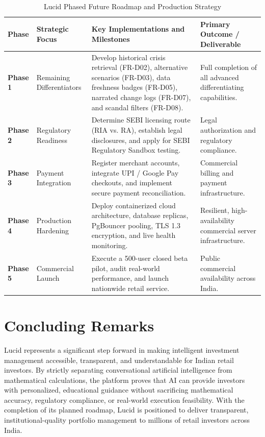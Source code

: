 \begin{table}[H]
\centering
\small
\setlength{\tabcolsep}{4pt}
\caption{Lucid Phased Future Roadmap and Production Strategy}
\label{tab:consolidated_roadmap}
\begin{tabularx}{\textwidth}{l >{\RaggedRight\arraybackslash}p{2.2cm} >{\RaggedRight\arraybackslash}X >{\RaggedRight\arraybackslash}p{3.0cm}}
\toprule
\textbf{Phase} & \textbf{Strategic Focus} & \textbf{Key Implementations and Milestones} & \textbf{Primary Outcome / Deliverable} \\
\midrule
\textbf{Phase 1} & Remaining Differentiators & Develop historical crisis retrieval (FR-D02), alternative scenarios (FR-D03), data freshness badges (FR-D05), narrated change logs (FR-D07), and scandal filters (FR-D08). & Full completion of all advanced differentiating capabilities. \\
\addlinespace[4pt]
\textbf{Phase 2} & Regulatory Readiness & Determine SEBI licensing route (RIA vs. RA), establish legal disclosures, and apply for SEBI Regulatory Sandbox testing. & Legal authorization and regulatory compliance. \\
\addlinespace[4pt]
\textbf{Phase 3} & Payment Integration & Register merchant accounts, integrate UPI / Google Pay checkouts, and implement secure payment reconciliation. & Commercial billing and payment infrastructure. \\
\addlinespace[4pt]
\textbf{Phase 4} & Production Hardening & Deploy containerized cloud architecture, database replicas, PgBouncer pooling, TLS 1.3 encryption, and live health monitoring. & Resilient, high-availability commercial server infrastructure. \\
\addlinespace[4pt]
\textbf{Phase 5} & Commercial Launch & Execute a 500-user closed beta pilot, audit real-world performance, and launch nationwide retail service. & Public commercial availability across India. \\
\bottomrule
\end{tabularx}
\end{table}

\section{Concluding Remarks}
Lucid represents a significant step forward in making intelligent investment management accessible, transparent, and understandable for Indian retail investors. By strictly separating conversational artificial intelligence from mathematical calculations, the platform proves that AI can provide investors with personalized, educational guidance without sacrificing mathematical accuracy, regulatory compliance, or real-world execution feasibility. With the completion of its planned roadmap, Lucid is positioned to deliver transparent, institutional-quality portfolio management to millions of retail investors across India.
